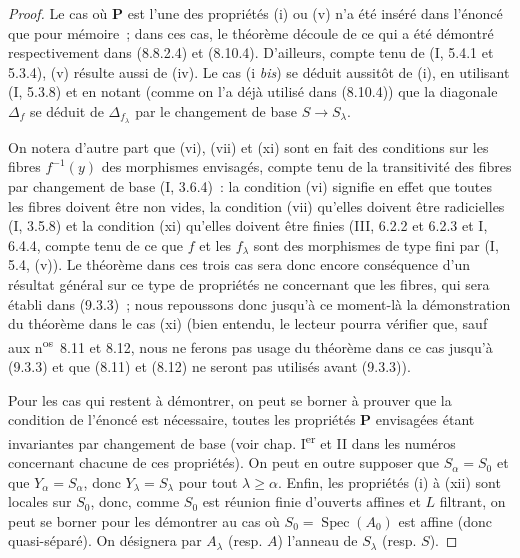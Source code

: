 \begin{proof}
Le cas où $\mathbf P$ est l'une des propriétés (i) ou (v) n'a été inséré dans
l'énoncé que pour mémoire~; dans ces cas, le théorème découle de ce qui a été
démontré respectivement dans (8.8.2.4) et (8.10.4). D'ailleurs, compte tenu de
(I, 5.4.1 et 5.3.4), (v) résulte aussi de (iv). Le cas (i \emph{bis}) se
déduit aussitôt de (i), en utilisant (I, 5.3.8) et en notant (comme on l'a
déjà utilisé dans (8.10.4)) que la diagonale $\Delta_f$ se déduit de
$\Delta_{f_\lambda}$ par le changement de base $S\to S_\lambda$.

On notera d'autre part que (vi), (vii) et (xi) sont en fait des conditions
sur les fibres $f^{-1}(y)$ des morphismes envisagés, compte tenu de la
transitivité des fibres par changement de base (I, 3.6.4)~: la condition (vi)
signifie en effet que toutes les fibres doivent être non vides, la condition
(vii) qu'elles doivent être radicielles (I, 3.5.8) et la condition (xi)
qu'elles doivent être finies (III, 6.2.2 et 6.2.3 et I, 6.4.4, compte tenu de
ce que $f$ et les $f_\lambda$ sont des morphismes de type fini par (I, 5.4,
(v)). Le théorème dans ces trois cas sera donc encore conséquence d'un
résultat général sur ce type de propriétés ne concernant que les fibres, qui
sera établi dans (9.3.3)~; nous repoussons donc jusqu'à ce moment-là la
démonstration du théorème dans le cas (xi) (bien entendu, le lecteur pourra
vérifier que, sauf aux n\textsuperscript{os}~8.11 et 8.12, nous ne ferons pas
usage du théorème dans ce cas jusqu'à (9.3.3) et que (8.11) et (8.12) ne
seront pas utilisés avant (9.3.3)).

Pour les cas qui restent à démontrer, on peut se borner à prouver que la
condition de l'énoncé est nécessaire, toutes les propriétés $\mathbf P$
envisagées étant invariantes par changement de base (voir chap. I\textsuperscript{er}
et II dans les numéros concernant chacune de ces propriétés). On peut en
outre supposer que $S_\alpha=S_0$ et que $Y_\alpha=S_\alpha$, donc
$Y_\lambda=S_\lambda$ pour tout $\lambda\geq\alpha$. Enfin, les propriétés
(i) à (xii) sont locales sur $S_0$, donc, comme $S_0$ est réunion finie
d'ouverts affines et $L$ filtrant, on peut se borner pour les démontrer au cas
où $S_0=\operatorname{Spec}(A_0)$ est affine (donc quasi-séparé). On désignera
par $A_\lambda$ (resp. $A$) l'anneau de $S_\lambda$ (resp. $S$).


\end{proof}
